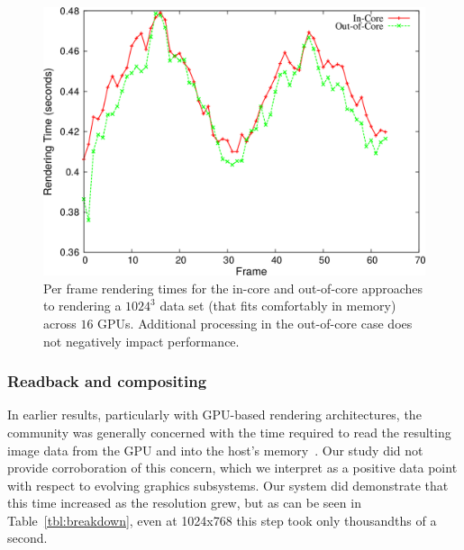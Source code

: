 \begin{figure}
  \includegraphics[width=\linewidth]{images/multiscale/ooc}
  \caption{Per frame rendering times for the in-core and out-of-core
  approaches to rendering a $1024^3$ data set (that fits comfortably in
  memory) across $16$ GPUs.  Additional processing in the out-of-core
  case does not negatively impact performance.}
  \label{fig:ooc}
\end{figure}

\subsubsection{Readback and compositing}

In earlier results, particularly with GPU-based rendering
architectures, the community was generally concerned with the time
required to read the resulting image data from the GPU and into the
host's
memory~\cite{Marchesin:2008:MultiGPU}.  Our study did not provide
corroboration of this concern, which we interpret as a positive data
point with respect to evolving graphics subsystems.  Our system did
demonstrate that this time increased as the resolution grew, but as can
be seen
in Table~\ref{tbl:breakdown}, even at 1024x768 this step took only
thousandths of a second.

